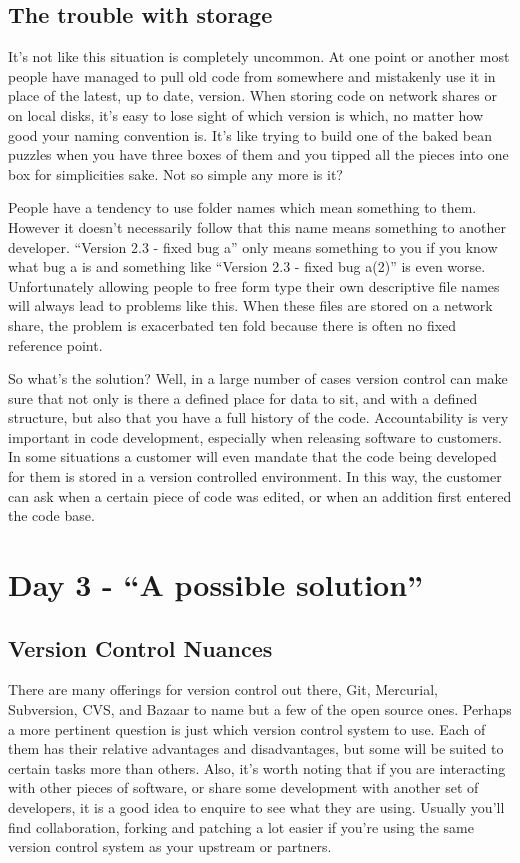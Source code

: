 \subsection{The trouble with storage}

It's not like this situation is completely uncommon.  At one point or another most people have managed to pull old code from somewhere and mistakenly use it in place of the latest, up to date, version.  When storing code on network shares or on local disks, it's easy to lose sight of which version is which, no matter how good your naming convention is.  It's like trying to build one of the baked bean puzzles when you have three boxes of them and you tipped all the pieces into one box for simplicities sake.  Not so simple any more is it?

People have a tendency to use folder names which mean something to them.  However it doesn't necessarily follow that this name means something to another developer.  ``Version 2.3 - fixed bug a'' only means something to you if you know what bug a is and something like ``Version 2.3 - fixed bug a(2)'' is even worse.  Unfortunately allowing people to free form type their own descriptive file names will always lead to problems like this.  When these files are stored on a network share, the problem is exacerbated ten fold because there is often no fixed reference point.

So what's the solution?  Well, in a large number of cases version control can make sure that not only is there a defined place for data to sit, and with a defined structure, but also that you have a full history of the code.  Accountability is very important in code development, especially when releasing software to customers.  In some situations a customer will even mandate that the code being developed for them is stored in a version controlled environment.  In this way, the customer can ask when a certain piece of code was edited, or when an addition first entered the code base.

\section{Day 3 - ``A possible solution''}
\subsection{Version Control Nuances}

There are many offerings for version control out there, Git, Mercurial, Subversion, CVS, and Bazaar to name but a few of the open source ones.  Perhaps a more pertinent question is just which version control system to use.  Each of them has their relative advantages and disadvantages, but some will be suited to certain tasks more than others.  Also, it's worth noting that if you are interacting with other pieces of software, or share some development with another set of developers, it is a good idea to enquire to see what they are using.  Usually you'll find collaboration, forking and patching a lot easier if you're using the same version control system as your upstream or partners.

